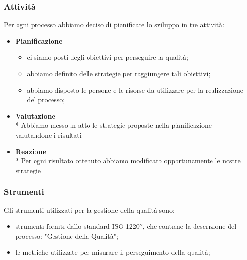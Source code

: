 \subsubsection{Attività}
Per ogni processo abbiamo deciso di pianificare lo sviluppo in tre attività:
\begin{itemize}
	\item \textbf{Pianificazione}
		\begin{itemize}
			\item ci siamo posti degli obiettivi per perseguire la qualità;
			\item abbiamo definito delle strategie per raggiungere tali obiettivi;
			\item abbiamo disposto le persone e le risorse da utilizzare per la realizzazione del processo;
		\end{itemize}
	\item \textbf{Valutazione} \\*
		Abbiamo messo in atto le strategie proposte nella pianificazione valutandone i risultati
	\item \textbf{Reazione} \\*
		Per ogni risultato ottenuto abbiamo modificato opportunamente le nostre strategie
\end{itemize}
\subsubsection{Strumenti}
Gli strumenti utilizzati per la gestione della qualità sono:
\begin{itemize}
	\item strumenti forniti dallo standard ISO-12207, che contiene la descrizione del processo: "Gestione della Qualità";
	\item le metriche utilizzate per misurare il perseguimento della qualità;
\end{itemize}
